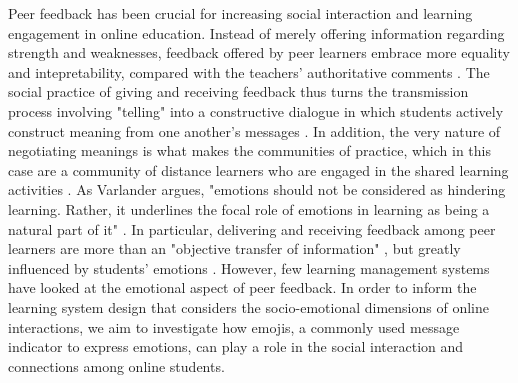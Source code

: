 \documentclass[chi_draft]{sigchi}
\begin{document}
Peer feedback has been crucial for increasing social interaction and learning engagement in online education. Instead of merely offering information regarding strength and weaknesses, feedback offered by peer learners embrace more equality and intepretability, compared with the teachers' authoritative comments . The social practice of giving and receiving feedback thus turns the transmission process involving "telling" into a constructive dialogue in which students actively construct meaning from one another's messages \cite{Juwah2004}. In addition, the very nature of negotiating meanings is what makes the communities of practice, which in this case are a community of distance learners who are engaged in the shared learning activities \cite{Lave1998}. As Varlander argues, "emotions should not be considered as hindering learning. Rather, it underlines the focal role of emotions in learning as being a natural part of it" \cite{Varlander2008}. In particular, delivering and receiving feedback among peer learners are more than an "objective transfer of information" \cite{Jacobs1974,Falchikov2013}, but greatly influenced by students' emotions \cite{Race1996}. However, few learning management systems have looked at the emotional aspect of peer feedback. In order to inform the learning system design that considers the socio-emotional dimensions of online interactions, we aim to investigate how emojis, a commonly used message indicator to express emotions, can play a role in the social interaction and connections among online students. 
\end{document}
